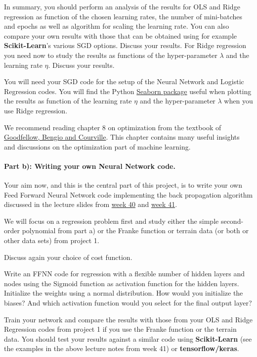 \documentclass[%
oneside,                 %
final,                   %
10pt]{article}
\begin{document}
\noindent
In summary, you should 
perform an analysis of the results for OLS and Ridge regression as
function of the chosen learning rates, the number of mini-batches and
epochs as well as algorithm for scaling the learning rate. You can
also compare your own results with those that can be obtained using
for example \textbf{Scikit-Learn}'s various SGD options.  Discuss your
results. For Ridge regression you need now to study the results as functions of  the hyper-parameter $\lambda$ and 
the learning rate $\eta$.  Discuss your results.

You will need your SGD code for the setup of the Neural Network and
Logistic Regression codes. You will find the Python \href{{https://seaborn.pydata.org/generated/seaborn.heatmap.html}}{Seaborn
package}
useful when plotting the results as function of the learning rate
$\eta$ and the hyper-parameter $\lambda$ when you use Ridge
regression.

We recommend reading chapter 8 on optimization from the textbook of \href{{https://www.deeplearningbook.org/}}{Goodfellow, Bengio and Courville}. This chapter contains many useful insights and discussions on the optimization part of machine learning.

\paragraph{Part b): Writing your own Neural Network code.}
Your aim now, and this is the central part of this project, is to
write your own Feed Forward Neural Network  code implementing the back
propagation algorithm discussed in the lecture slides from \href{{https://compphysics.github.io/MachineLearning/doc/pub/week41/html/week40.html}}{week 40} and
\href{{https://compphysics.github.io/MachineLearning/doc/pub/week41/html/week41.html}}{week 41}.

We will focus on a regression problem first and study either the simple second-order polynomial from part a) or the 
Franke function or terrain data (or both or other data sets) from
project 1.

Discuss again your choice of cost function.

Write an FFNN code for regression with a flexible number of hidden
layers and nodes using the Sigmoid function as activation function for
the hidden layers. Initialize the weights using a normal
distribution. How would you initialize the biases? And which
activation function would you select for the final output layer?

Train your network and compare the results with those from your OLS and Ridge Regression codes from project 1 if you use the Franke function or the terrain data.
You should test your results against a similar code using \textbf{Scikit-Learn} (see the examples in the above lecture notes from week 41) or \textbf{tensorflow/keras}. 
\end{document}
